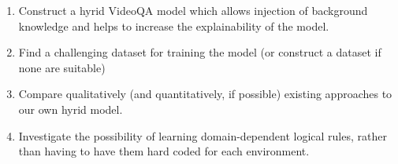 \begin{enumerate}
  \item Construct a hyrid VideoQA model which allows injection of background knowledge and helps to increase the explainability of the model.

  \item Find a challenging dataset for training the model (or construct a dataset if none are suitable)

  \item Compare qualitatively (and quantitatively, if possible) existing approaches to our own hyrid model.

  \item Investigate the possibility of learning domain-dependent logical rules, rather than having to have them hard coded for each environment.
\end{enumerate}



